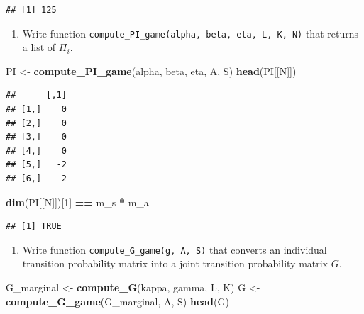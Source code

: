 \documentclass[]{book}
\newenvironment{Shaded}{\begin{snugshade}}{\end{snugshade}}
\newcommand{\KeywordTok}[1]{\textcolor[rgb]{0.13,0.29,0.53}{\textbf{#1}}}
\newcommand{\DecValTok}[1]{\textcolor[rgb]{0.00,0.00,0.81}{#1}}
\newcommand{\StringTok}[1]{\textcolor[rgb]{0.31,0.60,0.02}{#1}}
\newcommand{\OperatorTok}[1]{\textcolor[rgb]{0.81,0.36,0.00}{\textbf{#1}}}
\newcommand{\NormalTok}[1]{#1}
\providecommand{\tightlist}{%
  \setlength{\itemsep}{0pt}\setlength{\parskip}{0pt}}
\begin{document}
\begin{verbatim}
## [1] 125
\end{verbatim}

\begin{enumerate}
\def\labelenumi{\arabic{enumi}.}
\setcounter{enumi}{2}
\tightlist
\item
  Write function
  \texttt{compute\_PI\_game(alpha,\ beta,\ eta,\ L,\ K,\ N)} that
  returns a list of \(\Pi_i\).
\end{enumerate}

\begin{Shaded}
\begin{Highlighting}[]
\NormalTok{PI <-}\StringTok{ }\KeywordTok{compute_PI_game}\NormalTok{(alpha, beta, eta, A, S)}
\KeywordTok{head}\NormalTok{(PI[[N]])}
\end{Highlighting}
\end{Shaded}

\begin{verbatim}
##      [,1]
## [1,]    0
## [2,]    0
## [3,]    0
## [4,]    0
## [5,]   -2
## [6,]   -2
\end{verbatim}

\begin{Shaded}
\begin{Highlighting}[]
\KeywordTok{dim}\NormalTok{(PI[[N]])[}\DecValTok{1}\NormalTok{] }\OperatorTok{==}\StringTok{ }\NormalTok{m_s }\OperatorTok{*}\StringTok{ }\NormalTok{m_a}
\end{Highlighting}
\end{Shaded}

\begin{verbatim}
## [1] TRUE
\end{verbatim}

\begin{enumerate}
\def\labelenumi{\arabic{enumi}.}
\setcounter{enumi}{3}
\tightlist
\item
  Write function \texttt{compute\_G\_game(g,\ A,\ S)} that converts an
  individual transition probability matrix into a joint transition
  probability matrix \(G\).
\end{enumerate}

\begin{Shaded}
\begin{Highlighting}[]
\NormalTok{G_marginal <-}\StringTok{ }\KeywordTok{compute_G}\NormalTok{(kappa, gamma, L, K)}
\NormalTok{G <-}\StringTok{ }\KeywordTok{compute_G_game}\NormalTok{(G_marginal, A, S)}
\KeywordTok{head}\NormalTok{(G)}
\end{Highlighting}
\end{Shaded}
\end{document}
